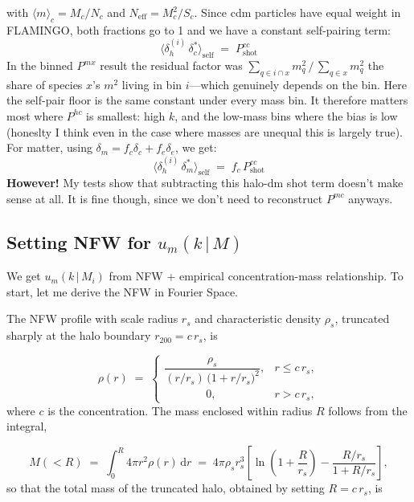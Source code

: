\documentclass{article}
\newcommand{\dd}{\mathrm{d}}
\begin{document}
{\begin{equation}
\end{equation}
with $\langle m \rangle_c = M_c/N_c$ and $N_\mathrm{eff} = M_c^2/S_c$. Since cdm particles have equal weight in FLAMINGO, both fractions go to 1 and we have a constant self-pairing term:
\begin{equation}
    \langle \delta_h^{(i)} \, \delta_c^* \rangle_\mathrm{self} \;=\;P^{cc}_\mathrm{shot}
\end{equation}
In the binned $P^{mx}$ result the residual factor was ${\sum_{q \in i \cap x} m_q^2}\,/\,{\sum_{q \in x} m_q^2}$
the share of species $x$'s $m^2$ living in bin 
$i$---which genuinely depends on the bin. Here the self-pair floor is the same constant under every mass bin. It therefore matters most where $P^{hc}$ is smallest: high $k$, and the low-mass bins where the bias is low (honeslty I think even in the case where masses are unequal this is largely true).
For matter, using $\delta_m = f_c \delta_c + f_e \delta_e$, we get:
\begin{equation}
     \langle \delta_h^{(i)} \, \delta_m^* \rangle_\mathrm{self} \;=\;f_c \, P^{cc}_\mathrm{shot}
\end{equation}
\textbf{However!} My tests show that subtracting this halo-dm shot term doesn't make sense at all. It is fine though, since we don't need to reconstruct $P^{mc}$ anyways.}



\subsection{Setting NFW for $u_m(k\,|\,M)$} \label{sec:nfw}
We get $u_m(k\,|\,M_i)$ from NFW + empirical concentration-mass relationship. To start, let me derive the NFW in Fourier Space.

The NFW profile with scale radius $r_s$ and characteristic density $\rho_s$,
truncated sharply at the halo boundary $r_{200}=c\,r_s$, is

\begin{equation}
  \rho(r) \;=\;
  \begin{cases}
    \dfrac{\rho_s}{(r/r_s)\,\bigl(1+r/r_s\bigr)^{2}}, & r \leq c\,r_s, \\[4ex]
    \phantom{aaaaaaa}0, & r > c\,r_s,
  \end{cases}
  \label{eq:nfw}
\end{equation}
where $c$ is the concentration. The mass enclosed within radius $R$ follows from
the integral,
 
\begin{equation}
  M(<R) \;=\; \int_{0}^{R} 4\pi r^{2}\rho(r)\,\dd r
        \;=\; 4\pi\rho_s r_s^{3}
          \left[\ln\!\left(1+\frac{R}{r_s}\right)-\frac{R/r_s}{1+R/r_s}\right],
  \label{eq:menc}
\end{equation}
 so that the total mass of the truncated halo, obtained by setting $R=c\,r_s$, is
 
\end{document}
